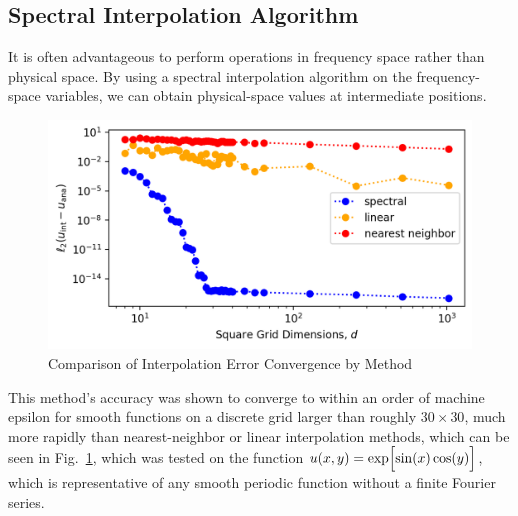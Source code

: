 \documentclass[10pt, reqno]{amsart}
\begin{document}
\begin{multicols}{2}
\section{Spectral Interpolation Algorithm}
It is often advantageous to perform operations in frequency space rather than physical space. By using a spectral interpolation algorithm on the frequency-space variables, we can obtain physical-space values at intermediate positions.
\vspace{-.1 in}
\begin{figure}[H]
    \centering
    \includegraphics[width=1\linewidth]{Comparison of Interpolation Convergence by Method.png}
    \caption{Comparison of Interpolation Error Convergence by Method}
    \label{fig:1}
\end{figure}
\vspace{-.1 in}
This method's accuracy was shown to converge to within an order of machine epsilon for smooth functions on a discrete grid larger than roughly $30 \times 30$, much more rapidly than nearest-neighbor or linear interpolation methods, which can be seen in Fig.~\ref{fig:1}, which was tested on the function $u(x, y) = \exp \Bigl[ \sin(x) \cos(y) \Bigr]$, which is representative of any smooth periodic function without a finite Fourier series.
\vspace{-.05 in}

\end{multicols}
\end{document}
